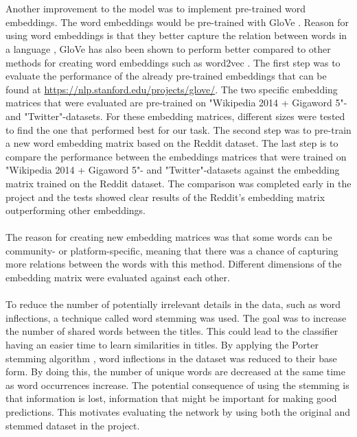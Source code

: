 \\\\
Another improvement to the model was to implement pre-trained word embeddings. The word embeddings would be pre-trained with GloVe \parencite{pennington2014glove}. Reason for using word embeddings is that they better capture the relation between words in a language \parencite{mikolov2013linguistic}, GloVe has also been shown to perform better compared to other methods for creating word embeddings such as word2vec \parencite{pennington2014glove}. The first step was to evaluate the performance of the already pre-trained embeddings that can be found at \url{https://nlp.stanford.edu/projects/glove/}. The two specific embedding matrices that were evaluated are pre-trained on "Wikipedia 2014 + Gigaword 5"- and "Twitter"-datasets. For these embedding matrices, different sizes were tested to find the one that performed best for our task. The second step was to pre-train a new word embedding matrix based on the Reddit dataset. The last step is to compare the performance between the embeddings matrices that were trained on "Wikipedia 2014 + Gigaword 5"- and "Twitter"-datasets against the embedding matrix trained on the Reddit dataset. The comparison was completed early in the project and the tests showed clear results of the Reddit's embedding matrix outperforming other embeddings.
\\\\
The reason for creating new embedding matrices was that some words can be community- or platform-specific, meaning that there was a chance of capturing more relations between the words with this method. Different dimensions of the embedding matrix were evaluated against each other. 
\\\\
To reduce the number of potentially irrelevant details in the data, such as word inflections, a technique called word stemming was used. The goal was to increase the number of shared words between the titles. This could lead to the classifier having an easier time to learn similarities in titles. By applying the Porter stemming algorithm \parencite{porter1980algorithm}, word inflections in the dataset was reduced to their base form. By doing this, the number of unique words are decreased at the same time as word occurrences increase. The potential consequence of using the stemming is that information is lost, information that might be important for making good predictions. This motivates evaluating the network by using both the original and stemmed dataset in the project.

